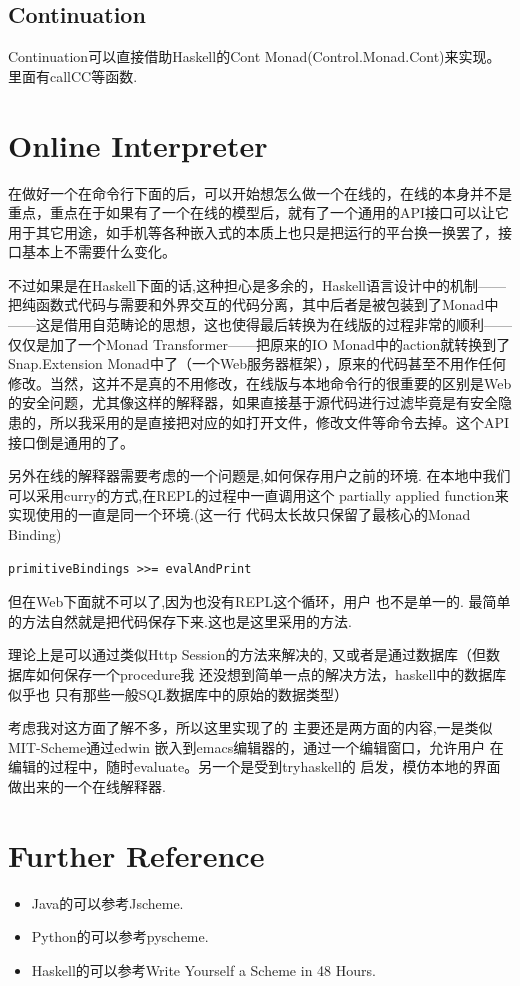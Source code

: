 \documentclass[11pt]{article}
\theoremstyle{definition}
\theoremstyle{remark}
\numberwithin{equation}{section}
\begin{document}
 \subsection{Continuation}
 Continuation可以直接借助Haskell的Cont Monad(Control.Monad.Cont)来实现。里面有callCC等函数.

\section{Online Interpreter}
在做好一个在命令行下面的后，可以开始想怎么做一个在线的，在线的本身并不是重点，重点在于如果有了一个在线的模型后，就有了一个通用的API接口可以让它用于其它用途，如手机等各种嵌入式的本质上也只是把运行的平台换一换罢了，接口基本上不需要什么变化。

不过如果是在Haskell下面的话,这种担心是多余的，Haskell语言设计中的机制——把纯函数式代码与需要和外界交互的代码分离，其中后者是被包装到了Monad中——这是借用自范畴论的思想，这也使得最后转换为在线版的过程非常的顺利——仅仅是加了一个Monad Transformer——把原来的IO Monad中的action就转换到了Snap.Extension Monad中了（一个Web服务器框架），原来的代码甚至不用作任何修改。当然，这并不是真的不用修改，在线版与本地命令行的很重要的区别是Web的安全问题，尤其像这样的解释器，如果直接基于源代码进行过滤毕竟是有安全隐患的，所以我采用的是直接把对应的如打开文件，修改文件等命令去掉。这个API接口倒是通用的了。

另外在线的解释器需要考虑的一个问题是,如何保存用户之前的环境.
在本地中我们可以采用curry的方式,在REPL的过程中一直调用这个
partially applied function来实现使用的一直是同一个环境.(这一行
代码太长故只保留了最核心的Monad Binding)
\begin{verbatim}
primitiveBindings >>= evalAndPrint 
\end{verbatim}

但在Web下面就不可以了,因为也没有REPL这个循环，用户
也不是单一的.
最简单的方法自然就是把代码保存下来.这也是这里采用的方法.

理论上是可以通过类似Http Session的方法来解决的,
又或者是通过数据库（但数据库如何保存一个procedure我
还没想到简单一点的解决方法，haskell中的数据库似乎也
只有那些一般SQL数据库中的原始的数据类型）

考虑我对这方面了解不多，所以这里实现了的
主要还是两方面的内容,一是类似MIT-Scheme通过edwin
嵌入到emacs编辑器的，通过一个编辑窗口，允许用户
在编辑的过程中，随时evaluate。另一个是受到tryhaskell的
启发，模仿本地的界面做出来的一个在线解释器.


\section{Further Reference}
\begin{itemize}
\item Java的可以参考Jscheme.
\item Python的可以参考pyscheme.
\item Haskell的可以参考Write Yourself a Scheme in 48 Hours.
\end{itemize}
\end{document}
